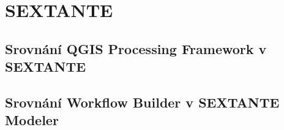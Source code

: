 \newpage
\chapter{SEXTANTE}

\section{Srovnání QGIS Processing Framework v SEXTANTE}



\section{Srovnání Workflow Builder v SEXTANTE Modeler}
